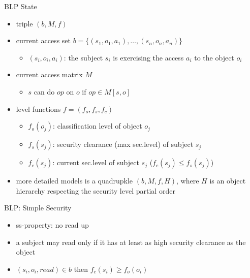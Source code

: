 \documentclass{beamer}
\begin{document}
\begin{frame}{BLP State}
  \begin{itemize}
  \item triple $(b,M,f)$
  \item current access set $b = \{(s_1,o_1,a_1),\dots,(s_n,o_n,a_n)\}$
    \begin{itemize}
    \item $(s_i,o_i,a_i)$: the subject $s_i$ is exercising the access
      $a_i$ to the object $o_i$
    \end{itemize}
  \item current access matrix $M$
    \begin{itemize}
    \item $s$ can do $op$ on $o$ if $op \in M[s,o]$
    \end{itemize}
  \item level functions $f=(f_o, f_s, f_c)$
    \begin{itemize}
      \item $f_o(o_j)$: classification level of object $o_j$
      \item $f_s(s_j)$: security clearance (max sec.level) of subject $s_j$
      \item $f_c(s_j)$: current sec.level of subject $s_j$
        ($f_c(s_j) \leq f_s(s_j)$)
    \end{itemize}
    \item more detailed models is a quadrupkle $(b,M,f, H)$,
      where $H$ is an object hierarchy respecting the security level partial
      order
  \end{itemize}
\end{frame}

\begin{frame}{BLP: Simple Security}
  \begin{itemize}
  \item ss-property: no read up
  \item a subject may read only if it has at least as high security
    clearance as the object
  \item $(s_i, o_i, read) \in b$ then
    $f_c(s_i) \geq f_o(o_i)$
  \end{itemize}
\end{frame}
\end{document}
